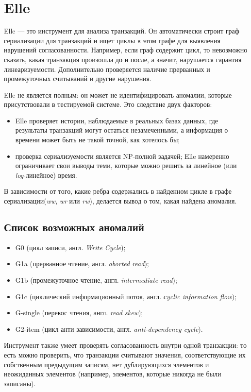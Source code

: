 \documentclass[12pt,  openany]{book}
\begin{document}
\section{Elle}
Elle --- это инструмент для анализа транзакций. Он автоматически строит граф сериализации для транзакций и ищет циклы в этом графе для выявления нарушений согласованности. Например, если граф содержит цикл, то невозможно сказать, какая транзакция произошла до и после, а значит, нарушается гарантия линеаризуемости.  
Дополнительно проверяется наличие прерванных и промежуточных считываний и другие нарушения.
\par Elle не является полным: он может не идентифицировать аномалии, которые присутствовали в тестируемой системе. Это следствие двух факторов:
\begin{itemize}
\item Elle проверяет истории, наблюдаемые в реальных базах данных, где результаты транзакций могут остаться незамеченными, а информация о времени может быть не такой точной, как хотелось бы;
\item проверка сериализуемости является NP-полной задачей; Elle намеренно ограничивает свои выводы теми, которые можно решить за линейное (или \textit{log}-линейное) время.
\end{itemize}
В зависимости от того, какие ребра содержались в найденном цикле в графе сериализации(\textit{ww}, \textit{wr} или \textit{rw}), делается вывод о том, какая найдена аномалия.
\subsection{Список возможных аномалий}
\begin{itemize}
\item G0 (цикл записи, англ. \textit{Write Cycle}); 
\item G1a (прерванное чтение, англ. \textit{aborted read});
\item G1b (промежуточное чтение, англ. \textit{intermediate read});
\item G1c (циклический информационный поток, англ. \textit{сyclic information flow});
\item G-single (перекос чтения, англ. \textit{read skew});
\item G2-item (цикл анти зависимости, англ.  \textit{anti-dependency cycle}).
\end{itemize}
\par Инструмент также умеет проверять согласованность внутри одной транзакции: то есть можно проверить, что транзакции считывают значения, соответствующие их собственным предыдущим записям, нет дублирующихся элементов и неожиданных элементов (например, элементов, которые никогда не были записаны).
\end{document}
